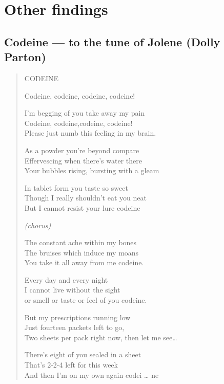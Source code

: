 \section{Other findings}
\label{sec:joleen}

	\subsection{Codeine --- to the tune of Jolene (Dolly Parton)}
		
		\begin{verse}
			\begin{centering}
			\note CODEINE \enote 
			 \vspace{0.3cm}
		
				Codeine, codeine, codeine, codeine!
				
				
				I'm begging of you take away my pain\\
				Codeine, codeine,codeine, codeine!\\
				Please just numb this feeling in my brain.
				
				
				As a powder you're beyond compare\\
				Effervescing when there's water there\\
				Your bubbles rising, bursting with a gleam
				
				
				In tablet form you taste so sweet\\
				Though I really shouldn't eat you neat\\
				But I cannot resist your lure codeine
				
				
				\emph{(chorus)}
				
				
				The constant ache within my bones\\
				The bruises which induce my moans\\
				You take it all away from me codeine.
				
				
				Every day and every night\\
				I cannot live without the sight\\
				or smell or taste or feel of you codeine.
				
				
				But my prescriptions running low\\
				Just fourteen packets left to go,\\
				Two sheets per pack right now, then let me see…
				
				
				There's eight of you sealed in a sheet\\
				That's 2-2-4 left for this week\\
				And then I'm on my own again codei … ne
				
			\end{centering}
		\end{verse}

